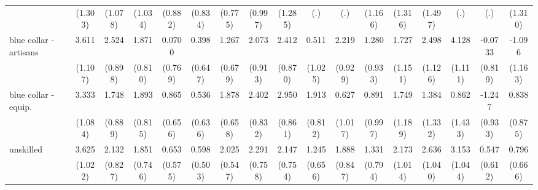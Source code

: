{\begin{tabular}{l*{16}{c}}
                    &     (1.303)         &     (1.078)         &     (1.034)         &     (0.882)         &     (0.834)         &     (0.775)         &     (0.997)         &     (1.285)         &         (.)         &         (.)         &     (1.166)         &     (1.316)         &     (1.497)         &         (.)         &         (.)         &     (1.310)         \\
[1em]
blue collar - artisans&       3.611\sym{**} &       2.524\sym{**} &       1.871\sym{*}  &      0.0700         &       0.398         &       1.267         &       2.073\sym{*}  &       2.412\sym{**} &       0.511         &       2.219\sym{*}  &       1.280         &       1.727         &       2.498\sym{*}  &       4.128\sym{***}&     -0.0733         &      -1.096         \\
                    &     (1.107)         &     (0.898)         &     (0.810)         &     (0.769)         &     (0.647)         &     (0.679)         &     (0.913)         &     (0.870)         &     (1.025)         &     (0.929)         &     (0.933)         &     (1.151)         &     (1.126)         &     (1.111)         &     (0.819)         &     (1.163)         \\
[1em]
blue collar - equip.&       3.333\sym{**} &       1.748\sym{*}  &       1.893\sym{*}  &       0.865         &       0.536         &       1.878\sym{**} &       2.402\sym{**} &       2.950\sym{***}&       1.913\sym{*}  &       0.627         &       0.891         &       1.749         &       1.384         &       0.862         &      -1.247         &       0.838         \\
                    &     (1.084)         &     (0.889)         &     (0.815)         &     (0.656)         &     (0.636)         &     (0.658)         &     (0.832)         &     (0.861)         &     (0.812)         &     (1.017)         &     (0.997)         &     (1.189)         &     (1.332)         &     (1.433)         &     (0.933)         &     (0.875)         \\
[1em]
unskilled           &       3.625\sym{***}&       2.132\sym{**} &       1.851\sym{*}  &       0.653         &       0.598         &       2.025\sym{***}&       2.291\sym{**} &       2.147\sym{**} &       1.245         &       1.888\sym{*}  &       1.331         &       2.173\sym{*}  &       2.636\sym{*}  &       3.153\sym{**} &       0.547         &       0.796         \\
                    &     (1.022)         &     (0.827)         &     (0.746)         &     (0.575)         &     (0.503)         &     (0.547)         &     (0.758)         &     (0.754)         &     (0.656)         &     (0.847)         &     (0.794)         &     (1.014)         &     (1.040)         &     (1.044)         &     (0.612)         &     (0.666)         \\

\end{tabular}}
